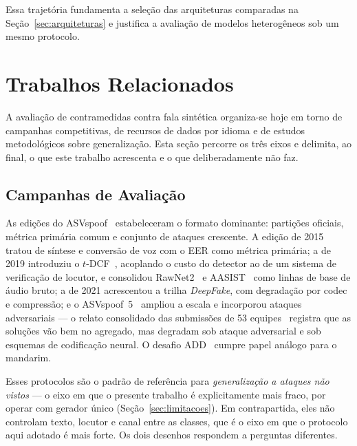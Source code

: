 \documentclass[12pt,a4paper]{article}
\begin{document}
Essa trajetória fundamenta a seleção das arquiteturas comparadas na
Seção~\ref{sec:arquiteturas} e justifica a avaliação de modelos heterogêneos
sob um mesmo protocolo.

\newpage

\section{Trabalhos Relacionados}
\label{sec:trabalhos_relacionados}

A avaliação de contramedidas contra fala sintética organiza-se hoje em torno de
campanhas competitivas, de recursos de dados por idioma e de estudos
metodológicos sobre generalização. Esta seção percorre os três eixos e delimita,
ao final, o que este trabalho acrescenta e o que deliberadamente não faz.

\subsection{Campanhas de Avaliação}

As edições do ASVspoof~\cite{wu2015asvspoof, todisco2019asvspoof,
	yamagishi2021asvspoof, wang2024asvspoof5} estabeleceram o formato dominante:
partições oficiais, métrica primária comum e conjunto de ataques crescente. A
edição de 2015 tratou de síntese e conversão de voz com o EER como métrica
primária; a de 2019 introduziu o $t$-DCF~\cite{kinnunen2018tdcf}, acoplando o
custo do detector ao de um sistema de verificação de locutor, e consolidou
RawNet2~\cite{tak2021rawnet2} e AASIST~\cite{jung2022aasist} como linhas de
base de áudio bruto; a de 2021 acrescentou a trilha \textit{DeepFake}, com
degradação por codec e compressão; e o ASVspoof~5~\cite{wang2024asvspoof5}
ampliou a escala e incorporou ataques adversariais --- o relato consolidado das
submissões de \num{53} equipes~\cite{wang2026asvspoof5eval} registra que as
soluções vão bem no agregado, mas degradam sob ataque adversarial e sob
esquemas de codificação neural. O desafio ADD~\cite{yi2022add} cumpre papel
análogo para o mandarim.

Esses protocolos são o padrão de referência para \emph{generalização a ataques
	não vistos} --- o eixo em que o presente trabalho é explicitamente mais fraco,
por operar com gerador único (Seção~\ref{sec:limitacoes}). Em contrapartida,
eles não controlam texto, locutor e canal entre as classes, que é o eixo em que
o protocolo aqui adotado é mais forte. Os dois desenhos respondem a perguntas
diferentes.
\end{document}
